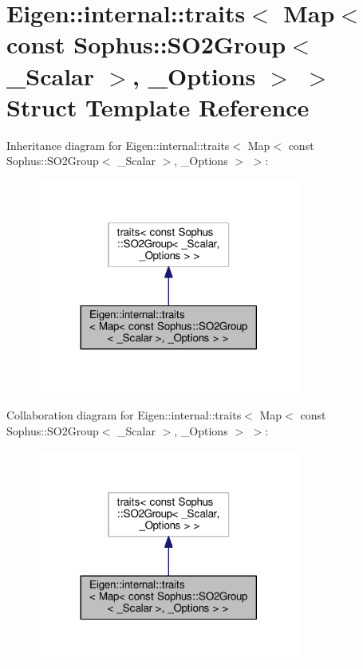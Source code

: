 \hypertarget{struct_eigen_1_1internal_1_1traits_3_01_map_3_01const_01_sophus_1_1_s_o2_group_3_01___scalar_01_4_00_01___options_01_4_01_4}{}\section{Eigen\+:\+:internal\+:\+:traits$<$ Map$<$ const Sophus\+:\+:S\+O2\+Group$<$ \+\_\+\+Scalar $>$, \+\_\+\+Options $>$ $>$ Struct Template Reference}
\label{struct_eigen_1_1internal_1_1traits_3_01_map_3_01const_01_sophus_1_1_s_o2_group_3_01___scalar_01_4_00_01___options_01_4_01_4}


Inheritance diagram for Eigen\+:\+:internal\+:\+:traits$<$ Map$<$ const Sophus\+:\+:S\+O2\+Group$<$ \+\_\+\+Scalar $>$, \+\_\+\+Options $>$ $>$\+:
\nopagebreak
\begin{figure}[H]
\begin{center}
\leavevmode
\includegraphics[width=245pt]{struct_eigen_1_1internal_1_1traits_3_01_map_3_01const_01_sophus_1_1_s_o2_group_3_01___scalar_01_75cb7900d1ac15d034e976b692579c81}
\end{center}
\end{figure}


Collaboration diagram for Eigen\+:\+:internal\+:\+:traits$<$ Map$<$ const Sophus\+:\+:S\+O2\+Group$<$ \+\_\+\+Scalar $>$, \+\_\+\+Options $>$ $>$\+:
\nopagebreak
\begin{figure}[H]
\begin{center}
\leavevmode
\includegraphics[width=245pt]{struct_eigen_1_1internal_1_1traits_3_01_map_3_01const_01_sophus_1_1_s_o2_group_3_01___scalar_01_f3203b9333f1813ea2d82ac40bd58298}
\end{center}
\end{figure}
